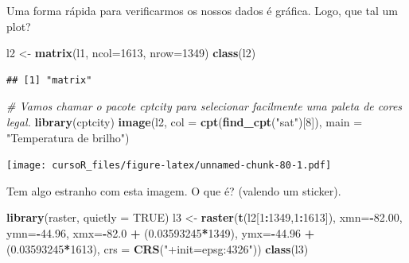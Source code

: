 \documentclass[]{book}
\newenvironment{Shaded}{\begin{snugshade}}{\end{snugshade}}
\newcommand{\KeywordTok}[1]{\textcolor[rgb]{0.13,0.29,0.53}{\textbf{#1}}}
\newcommand{\DataTypeTok}[1]{\textcolor[rgb]{0.13,0.29,0.53}{#1}}
\newcommand{\DecValTok}[1]{\textcolor[rgb]{0.00,0.00,0.81}{#1}}
\newcommand{\FloatTok}[1]{\textcolor[rgb]{0.00,0.00,0.81}{#1}}
\newcommand{\StringTok}[1]{\textcolor[rgb]{0.31,0.60,0.02}{#1}}
\newcommand{\CommentTok}[1]{\textcolor[rgb]{0.56,0.35,0.01}{\textit{#1}}}
\newcommand{\OtherTok}[1]{\textcolor[rgb]{0.56,0.35,0.01}{#1}}
\newcommand{\OperatorTok}[1]{\textcolor[rgb]{0.81,0.36,0.00}{\textbf{#1}}}
\newcommand{\NormalTok}[1]{#1}
\theoremstyle{definition}
\theoremstyle{definition}
\theoremstyle{definition}
\theoremstyle{remark}
\begin{document}
Uma forma rápida para verificarmos os nossos dados é gráfica. Logo, que
tal um plot?

\begin{Shaded}
\begin{Highlighting}[]
\NormalTok{l2 <-}\StringTok{ }\KeywordTok{matrix}\NormalTok{(l1, }\DataTypeTok{ncol=}\DecValTok{1613}\NormalTok{, }\DataTypeTok{nrow=}\DecValTok{1349}\NormalTok{)}
\KeywordTok{class}\NormalTok{(l2)}
\end{Highlighting}
\end{Shaded}

\begin{verbatim}
## [1] "matrix"
\end{verbatim}

\begin{Shaded}
\begin{Highlighting}[]
\CommentTok{# Vamos chamar o pacote cptcity para selecionar facilmente uma paleta de cores legal.}
\KeywordTok{library}\NormalTok{(cptcity)   }
\KeywordTok{image}\NormalTok{(l2,}
      \DataTypeTok{col =} \KeywordTok{cpt}\NormalTok{(}\KeywordTok{find_cpt}\NormalTok{(}\StringTok{"sat"}\NormalTok{)[}\DecValTok{8}\NormalTok{]),}
      \DataTypeTok{main =} \StringTok{"Temperatura de brilho"}\NormalTok{) }
\end{Highlighting}
\end{Shaded}

\texttt{[image: cursoR\_files/figure-latex/unnamed-chunk-80-1.pdf]}

Tem algo estranho com esta imagem. O que é? (valendo um sticker).

\begin{Shaded}
\begin{Highlighting}[]
\KeywordTok{library}\NormalTok{(raster, }\DataTypeTok{quietly =} \OtherTok{TRUE}\NormalTok{)}
\NormalTok{l3 <-}\StringTok{ }\KeywordTok{raster}\NormalTok{(}\KeywordTok{t}\NormalTok{(l2[}\DecValTok{1}\OperatorTok{:}\DecValTok{1349}\NormalTok{,}\DecValTok{1}\OperatorTok{:}\DecValTok{1613}\NormalTok{]),}
                     \DataTypeTok{xmn=}\OperatorTok{-}\FloatTok{82.00}\NormalTok{,}
                     \DataTypeTok{ymn=}\OperatorTok{-}\FloatTok{44.96}\NormalTok{,}
                     \DataTypeTok{xmx=}\OperatorTok{-}\FloatTok{82.0}  \OperatorTok{+}\StringTok{ }\NormalTok{(}\FloatTok{0.03593245}\OperatorTok{*}\DecValTok{1349}\NormalTok{), }
                     \DataTypeTok{ymx=}\OperatorTok{-}\FloatTok{44.96} \OperatorTok{+}\StringTok{ }\NormalTok{(}\FloatTok{0.03593245}\OperatorTok{*}\DecValTok{1613}\NormalTok{),}
                     \DataTypeTok{crs =} \KeywordTok{CRS}\NormalTok{(}\StringTok{"+init=epsg:4326"}\NormalTok{))}
\KeywordTok{class}\NormalTok{(l3)}
\end{Highlighting}
\end{Shaded}
\end{document}
